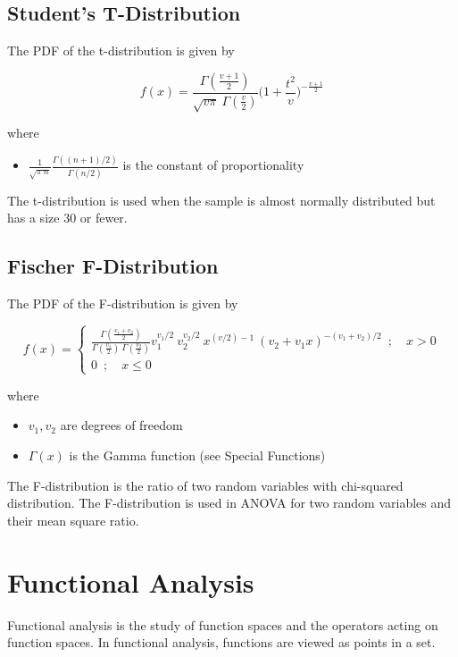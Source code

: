 \documentclass{article}
\begin{document}
\subsection{Student's T-Distribution}
The PDF of the t-distribution is given by

$$
f(x) = \frac{ \Gamma (\frac{v+1}{2}) }{ \sqrt{v \pi} \: \Gamma (\frac{v}{2}) } \Big (1+ \frac{t^2}{v} \Big ) ^ {-\frac{v+1}{2}}
$$ 

where

\begin{itemize}
    \item $\frac{1}{\sqrt{\pi\:n}} \frac{\Gamma((n+1)/2)}{\Gamma(n/2)}$ is the constant of proportionality
\end{itemize}

The t-distribution is used when the sample is almost normally distributed but has a size 30 or fewer.

\subsection{Fischer F-Distribution}
The PDF of the F-distribution is given by

$$
f(x) = \begin{cases} \frac{\Gamma (\frac{v_1 + v_2}{2}) }{ \Gamma (\frac{v_1}{2}) \: \Gamma (\frac{v_2}{2}) } v_1^{v_1/2} \: v_2^{ v_2/2} \: x^{ (v / 2)-1 } \: (v_2 + v_1 x)^{-(v_1 + v_2)/2} \enspace ; \quad x > 0 \\ 0 \enspace ; \quad x \leq 0 \end{cases}
$$

where

\begin{itemize}
    \item $v_1, v_2$ are degrees of freedom
    \item $\Gamma(x)$ is the Gamma function (see Special Functions)
\end{itemize}

The F-distribution is the ratio of two random variables with chi-squared distribution. The F-distribution is used in ANOVA for two random variables and their mean square ratio.

\newpage
\section{Functional Analysis}
Functional analysis is the study of function spaces and the operators acting on function spaces. In functional analysis, functions are viewed as points in a set.
\end{document}
